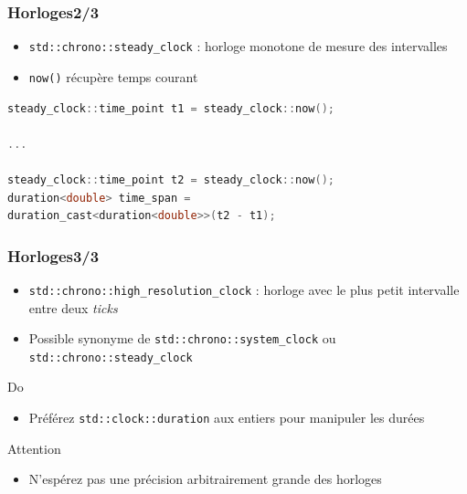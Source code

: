 \documentclass[C++.tex]{subfiles}
\begin{document}
\begin{frame}[fragile]
	\frametitle{Horloges\titlehfill{}2/3}
	\begin{itemize}
		\item \lstinline|std::chrono::steady_clock| : horloge monotone de mesure des intervalles


		\item \lstinline|now()| récupère temps courant
	\end{itemize}

	\begin{lstlisting}[language=C++]
steady_clock::time_point t1 = steady_clock::now();

...

steady_clock::time_point t2 = steady_clock::now();
duration<double> time_span = 
duration_cast<duration<double>>(t2 - t1);\end{lstlisting}
\end{frame}

\begin{frame}[fragile]
	\frametitle{Horloges\titlehfill{}3/3}
	\begin{itemize}
		\item \lstinline|std::chrono::high_resolution_clock| : horloge avec le plus petit intervalle entre deux \textit{ticks}
		\item Possible synonyme de \lstinline|std::chrono::system_clock| ou \lstinline|std::chrono::steady_clock|
	\end{itemize}

	\begin{exampleblock}{Do}
		\begin{itemize}
			\item Préférez \lstinline|std::clock::duration| aux entiers pour manipuler les durées
		\end{itemize}

	\end{exampleblock}

	\begin{alertblock}{Attention}
		\begin{itemize}
			\item N'espérez pas une précision arbitrairement grande des horloges
		\end{itemize}

	\end{alertblock}
\end{frame}
\end{document}
